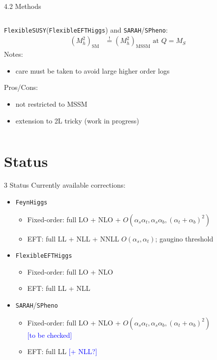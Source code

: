 \documentclass[hyperref={pdfpagelabels=false},ngerman]{beamer}
\newcommand{\cmark}{\ding{51}}%
\newcommand{\xmark}{\ding{55}}%
\newcommand{\ok}{\textcolor{darkgreen}{\cmark}}
\newcommand{\notok}{\textcolor{red}{\xmark}}
\newcommand{\MS}{\ensuremath{M_S}}
\newcommand{\SM}{\ensuremath{\text{SM}}}
\newcommand{\MSSM}{\ensuremath{\text{MSSM}}}
\newcommand{\fs}{\texttt{FlexibleSUSY}\xspace}
\newcommand{\feft}{\texttt{FlexibleEFTHiggs}\xspace}
\newcommand{\FH}{\texttt{FeynHiggs}\xspace}
\newcommand{\SPheno}{\texttt{SPheno}\xspace}
\newcommand{\SARAH}{\texttt{SARAH}\xspace}
\newcommand{\at}{\alpha_t}
\newcommand{\ab}{\alpha_b}
\newcommand{\as}{\alpha_s}
\newcommand{\avnote}[1]{\textcolor{blue}{[#1]}}
\begin{document}
\begin{frame}{4.2 Methods}
    \begin{columns}
    \begin{column}{0.5\textwidth}
      \centering
      \texttt{[image: \{\{plots/kuts-9/4.2.2]}}}
    \end{column}
    \begin{column}{0.5\textwidth}
      \fs (\feft) and \SARAH/\SPheno:
      \begin{align*}
        (M_h^2)_{\SM} &\overset{!}{=} (M_h^2)_{\MSSM} \text{ at } Q = \MS
      \end{align*}
      Notes:
      \begin{itemize}
      \item care must be taken to avoid large higher order logs
      \end{itemize}
      Pros/Cons:
      \begin{itemize}
      \item[\ok] not restricted to MSSM
      \item[\notok] extension to 2L tricky (work in progress)
      \end{itemize}
    \end{column}
  \end{columns}
\end{frame}

\section{Status}

\begin{frame}{3 Status}
  Currently available corrections:\\[1em]
  \begin{itemize}
  \item \FH
    \begin{itemize}
    \item Fixed-order: full LO + NLO + $O(\as\at,\as\ab,(\at + \ab)^2)$
    \item EFT: full LL + NLL + NNLL $O(\as,\at)$; gaugino threshold
    \end{itemize}
  \item \feft
    \begin{itemize}
    \item Fixed-order: full LO + NLO
    \item EFT: full LL + NLL
    \end{itemize}
  \item \SARAH/\SPheno
    \begin{itemize}
    \item Fixed-order: full LO + NLO + $O(\as \at, \as \ab, (\at + \ab)^2)$
      \\\avnote{to be checked}
    \item EFT: full LL \avnote{+ NLL?}
    \end{itemize}
  \end{itemize}
\end{frame}
\end{document}
